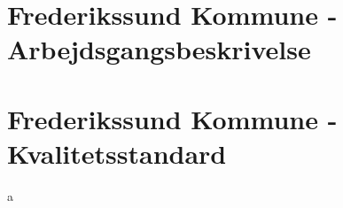 \appendix
\chapter{Frederikssund Kommune - Arbejdsgangsbeskrivelse} \label{appendix:frederikssund:arbejdsgangsbeskrivelse}


\chapter{Frederikssund Kommune - Kvalitetsstandard} \label{appendix:frederikssund:kvalitetsstandard}
a